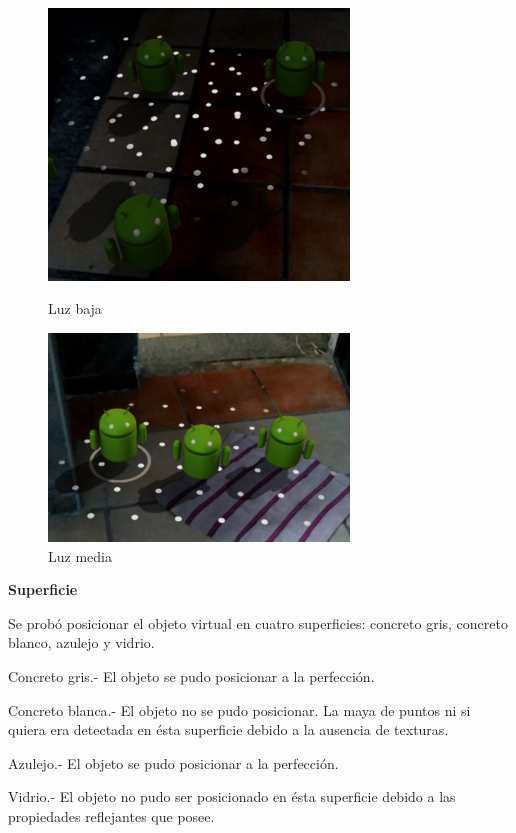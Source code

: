 \begin{figure}[!htbp]
	\begin{minipage}{0.48\textwidth}
		\centering
		\includegraphics[width=8cm]{desarrollo/secciones/pruebas/motog6/img/LUZBAJA.png}
		\caption{Luz baja}
		\label{fig:motog6lbaja}
	\end{minipage}\hfill
	\begin{minipage}{0.48\textwidth}
		\centering
		\includegraphics[width=8cm]{desarrollo/secciones/pruebas/motog6/img/LUZMEDIA.png}
		\caption{Luz media}
		\label{fig:motog6lmedia}
	\end{minipage}\hfill
\end{figure}

\textbf{Superficie} \par
Se probó posicionar el objeto virtual en cuatro superficies: concreto gris, concreto blanco, azulejo y vidrio.\par
Concreto gris.- El objeto se pudo posicionar a la perfección.\par
Concreto blanca.- El objeto no se pudo posicionar. La maya de puntos ni si quiera era detectada en ésta superficie debido a la ausencia de texturas.\par
Azulejo.- El objeto se pudo posicionar a la perfección.\par
Vidrio.- El objeto no pudo ser posicionado en ésta superficie debido a las propiedades reflejantes que posee.\par

